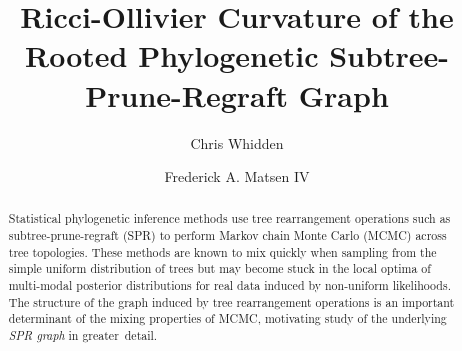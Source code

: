\documentclass[]{elsarticle}
\begin{document}

\begin{frontmatter}


	\title{Ricci-Ollivier Curvature of the Rooted Phylogenetic Subtree-Prune-Regraft Graph}


	\author{Chris Whidden}

\author{Frederick A. Matsen IV}


\address{Program in Computational Biology, Fred Hutchinson Cancer Research Center, Seattle, WA, USA 98109}

\begin{abstract}
Statistical phylogenetic inference methods use tree rearrangement operations such as subtree-prune-regraft (SPR) to perform Markov chain Monte Carlo (MCMC) across tree topologies.
These methods are known to mix quickly when sampling from the simple uniform distribution of trees but may become stuck in the local optima of multi-modal posterior distributions for real data induced by non-uniform likelihoods.
The structure of the graph induced by tree rearrangement operations is an important determinant of the mixing properties of MCMC, motivating study of the underlying \emph{SPR graph} in greater~detail.


\end{abstract}
\end{frontmatter}
\end{document}
